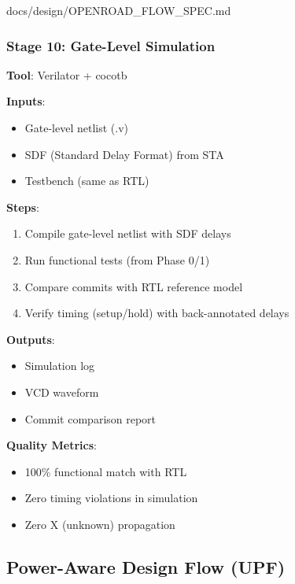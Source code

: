 \begin{relocated}{docs/design/OPENROAD_FLOW_SPEC.md}
\subsubsection{Stage 10: Gate-Level Simulation}\label{tm:pd:openroad-flow:stage-10-gate-level-simulation}

\textbf{Tool}: Verilator + cocotb

\textbf{Inputs}:

\begin{itemize}
\tightlist
\item
  Gate-level netlist (.v)
\item
  SDF (Standard Delay Format) from STA
\item
  Testbench (same as RTL)
\end{itemize}

\textbf{Steps}:

\begin{enumerate}
\def\labelenumi{\arabic{enumi}.}
\tightlist
\item
  Compile gate-level netlist with SDF delays
\item
  Run functional tests (from Phase 0/1)
\item
  Compare commits with RTL reference model
\item
  Verify timing (setup/\allowbreak{}hold) with back-annotated delays
\end{enumerate}

\textbf{Outputs}:

\begin{itemize}
\tightlist
\item
  Simulation log
\item
  VCD waveform
\item
  Commit comparison report
\end{itemize}

\textbf{Quality Metrics}:

\begin{itemize}
\tightlist
\item
  100\% functional match with RTL
\item
  Zero timing violations in simulation
\item
  Zero X (unknown) propagation
\end{itemize}

\subsection{Power-Aware Design Flow (UPF)}\label{tm:pd:openroad-flow:power-aware-design-flow-upf}


\end{relocated}
